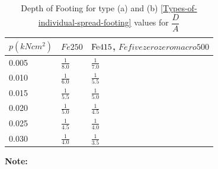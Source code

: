 
\begin{table}
\centering
\caption{Depth of Footing for type (a) and (b) \figmacro \ref{Types-of-individual-spread-footing} values for $\dfrac{D}{A}$}
\begin{tabular}{ |p{3cm}|p{3cm}|p{3cm}|}
 \hline
 $p(kN cm^2)$ & $Fe 250$ & $\Fefouronefivemacro$, $Fefivezerozeromacro 500$\\[0.8 ex]
 \hline
 0.005 &$\frac{1}{8.0}$ &$\frac{1}{7.0}$\\[0.5 ex]
 0.010 &$\frac{1}{6.0}$ &$\frac{1}{5.5}$\\[0.5 ex]
 0.015&$\frac{1}{5.5}$ &$\frac{1}{5.0}$\\[0.5 ex]
 0.020 &$\frac{1}{5.0}$ &$\frac{1}{4.5}$\\[0.5 ex]
 0.025 &$\frac{1}{4.5}$ &$\frac{1}{4.0}$\\[0.5 ex]
 0.030 &$\frac{1}{4.0}$ &$\frac{1}{3.5}$\\[2 ex]
 \hline
    \end{tabular}
    \label{chaptertable}
\end{table}

\textbf{Note:}


